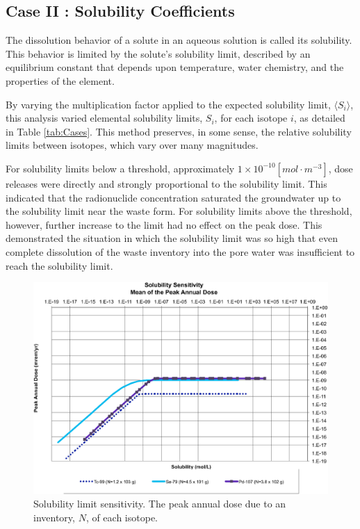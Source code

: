 
\subsection{Case II : Solubility Coefficients}

The dissolution behavior of a solute in an aqueous solution is called its 
solubility. This behavior is limited by the solute's solubility limit, described  
by an equilibrium constant that depends upon temperature, water chemistry, and 
the properties of the element. 

By varying the multiplication factor applied to the expected solubility limit, 
$\langle S_i\rangle$, this analysis varied elemental solubility limits, $S_i$, 
for each isotope $i$, as detailed in Table \ref{tab:Cases}.
This method preserves, in some sense, the relative solubility 
limits between isotopes, which vary over many magnitudes.

For solubility limits below a threshold, approximately 
$1\times10^{-10}[mol\cdot m^{-3}]$, dose releases were directly 
and strongly proportional to the solubility limit. This indicated that the radionuclide 
concentration saturated the groundwater up to the solubility limit near the 
waste form.  For solubility limits above the threshold, however, further 
increase to the limit had no effect on the peak dose. This demonstrated the 
situation in which the solubility limit was so high that even complete 
dissolution of the waste inventory into the pore water was insufficient to reach 
the solubility limit.

\begin{figure}[ht]
  \centering
  \includegraphics[width=\linewidth]{Solubility_Summary.eps}
  \caption{Solubility limit sensitivity. The peak annual dose due to an 
  inventory, 
  $N$, of each isotope.}
  \label{fig:SolSum}
\end{figure}

